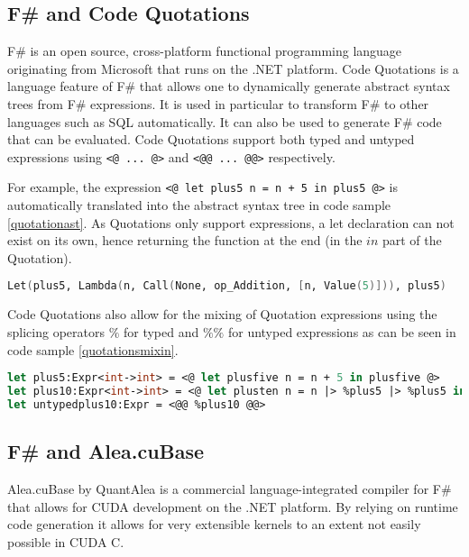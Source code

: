 \subsection{F\# and Code Quotations}\label{subsec:background:codequotations}
F\#\cite{fsharp} is an open source, cross-platform functional programming language originating from Microsoft that runs on the .NET platform.
Code Quotations is a language feature of F\# that allows one to dynamically generate abstract syntax trees from F\# expressions. 
It is used in particular to transform F\# to other languages such as SQL automatically. 
It can also be used to generate F\# code that can be evaluated. 
Code Quotations support both typed and untyped expressions using \lstinline$<@ ... @>$ and \lstinline$<@@ ... @@>$ respectively. 

For example, the expression \lstinline$<@ let plus5 n = n + 5 in plus5 @>$ is automatically translated into the abstract syntax tree in code sample \ref{quotationast}. 
As Quotations only support expressions, a let declaration can not exist on its own, hence returning the function at the end (in the $in$ part of the Quotation).
\begin{lstlisting}[language=FSharp, caption=Abstract syntax tree for the example Quotation expression, label=quotationast]
Let(plus5, Lambda(n, Call(None, op_Addition, [n, Value(5)])), plus5)
\end{lstlisting}

Code Quotations also allow for the mixing of Quotation expressions using the splicing operators $\%$ for typed and $\%\%$ for untyped expressions as can be seen in code sample \ref{quotationsmixin}.

\begin{lstlisting}[caption=Quotation mixing, label=quotationsmixin, language=FSharp]
let plus5:Expr<int->int> = <@ let plusfive n = n + 5 in plusfive @>
let plus10:Expr<int->int> = <@ let plusten n = n |> %plus5 |> %plus5 in plusten @>
let untypedplus10:Expr = <@@ %plus10 @@>
\end{lstlisting}


\subsection{F\# and Alea.cuBase}\label{subsec:background:fsharpcubase}
Alea.cuBase by QuantAlea\cite{quantalea} is a commercial language-integrated compiler for F\# that allows for CUDA development on the .NET platform.
By relying on runtime code generation it allows for very extensible kernels to an extent not easily possible in CUDA C.


